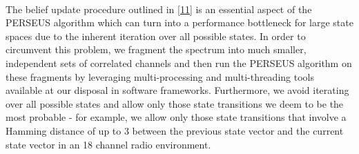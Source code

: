 \documentclass[10pt,twocolumn]{IEEEtran}
\begin{document}
\\The belief update procedure outlined in \eqref{11} is an essential aspect of the PERSEUS algorithm which can turn into a performance bottleneck for large state spaces due to the inherent iteration over all possible states. In order to circumvent this problem, we fragment the spectrum into much smaller, independent sets of correlated channels and then run the PERSEUS algorithm on these fragments by leveraging multi-processing and multi-threading tools available at our disposal in software frameworks. Furthermore, we avoid iterating over all possible states and allow only those state transitions we deem to be the most probable - for example, we allow only those state transitions that involve a Hamming distance of up to 3 between the previous state vector and the current state vector in an 18 channel radio environment.

 
\end{document}
